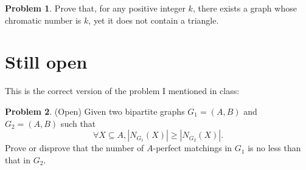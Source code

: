 \documentclass[12pt]{article}
\theoremstyle{definition}
\newtheorem{hw}{Problem}
\begin{document}
\begin{hw}
Prove that, for any positive integer $k$, there exists
a graph whose chromatic number is $k$, yet it does not
contain a triangle.
\end{hw}

\section{Still open}

This is the correct version of the problem I mentioned in class:

\begin{hw} (Open) Given two bipartite graphs $G_1 = (A, B)$ and $G_2 = (A, B)$ such that
  \[ \forall X \subseteq A, |N_{G_1}(X)| \geq |N_{G_2}(X)|.\]
Prove or disprove that the number of $A$-perfect matchings in $G_1$ is no less than that in $G_2$.
\end{hw}
\end{document}
